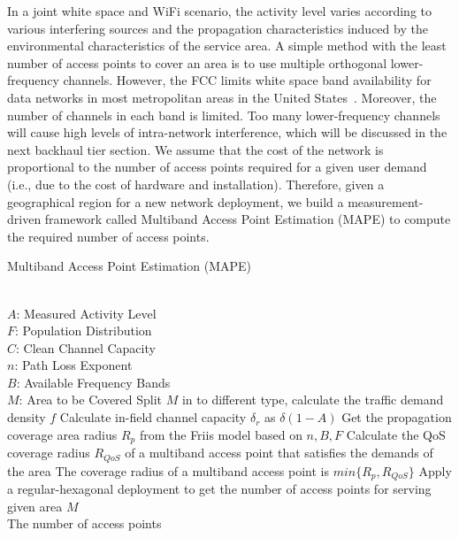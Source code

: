 In a joint white space and WiFi scenario, the activity level varies according to various interfering sources 
and the propagation characteristics induced by the environmental characteristics of the service area. A 
simple method with the least number of access points to cover an area is to use multiple orthogonal 
lower-frequency channels. However, the FCC limits white space band availability for data networks in most 
metropolitan areas in the United States~\cite{googledatabase}. Moreover, the number of channels in each band 
is limited. Too many lower-frequency channels will cause high levels of intra-network interference, 
which will be discussed in the next backhaul tier section. We assume that the cost of the network is proportional to the 
number of access points required for a given user demand (i.e., due to the cost of hardware and installation). 
Therefore, given a geographical region for a new network deployment, we build a measurement-driven framework 
called Multiband Access Point Estimation (MAPE) to compute the required number of access points.


\begin{algorithm}[t]
\small
\caption{Multiband Access Point Estimation (MAPE)}
\label{algorithm:mape}
\begin{algorithmic}[1]
\REQUIRE  ~~\\
$A$: Measured Activity Level \\
$F$: Population Distribution\\
$C$: Clean Channel Capacity\\
$n$: Path Loss Exponent \\
$B$: Available Frequency Bands\\
$M$: Area to be Covered
\STATE Split $M$ in to different type, calculate the traffic demand density $f$
\STATE Calculate in-field channel capacity $\delta_r$ as $\delta(1-A)$
\STATE Get the propagation coverage area radius $R_p$ from the Friis model based on $n,B,F$
\STATE Calculate the QoS coverage radius $R_{QoS}$ of a multiband access point that satisfies the demands of the area
\STATE The coverage radius of a multiband access point is $min\{R_p,R_{QoS}\}$
\STATE Apply a regular-hexagonal deployment to get the number of access points for serving given area $M$
\ENSURE ~~\\
The number of access points\\
\end{algorithmic}
\end{algorithm}

